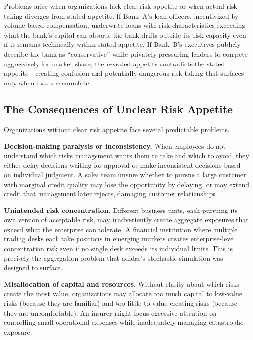 \documentclass[11pt,openany]{book}
\begin{document}
Problems arise when organizations lack clear risk appetite or when actual
risk-taking diverges from stated appetite. If Bank~A's loan officers,
incentivized by volume-based compensation, underwrite loans with risk
characteristics exceeding what the bank's capital can absorb, the bank drifts
outside its risk capacity even if it remains technically within stated appetite.
If Bank~B's executives publicly describe the bank as ``conservative'' while
privately pressuring lenders to compete aggressively for market share, the
revealed appetite contradicts the stated appetite---creating confusion and
potentially dangerous risk-taking that surfaces only when losses accumulate.

\subsection{The Consequences of Unclear Risk Appetite}
\label{subsec:consequences-unclear-appetite}

Organizations without clear risk appetite face several predictable problems.

\textbf{Decision-making paralysis or inconsistency.} When employees do not
understand which risks management wants them to take and which to avoid, they
either delay decisions waiting for approval or make inconsistent decisions based
on individual judgment. A sales team unsure whether to pursue a large customer
with marginal credit quality may lose the opportunity by delaying, or may extend
credit that management later rejects, damaging customer relationships.

\textbf{Unintended risk concentration.} Different business units, each pursuing
its own version of acceptable risk, may inadvertently create aggregate exposures
that exceed what the enterprise can tolerate. A financial institution where
multiple trading desks each take positions in emerging markets creates
enterprise-level concentration risk even if no single desk exceeds its
individual limits. This is precisely the aggregation problem that adidas's
stochastic simulation was designed to surface.

\textbf{Misallocation of capital and resources.} Without clarity about which
risks create the most value, organizations may allocate too much capital to
low-value risks (because they are familiar) and too little to value-creating
risks (because they are uncomfortable). An insurer might focus excessive
attention on controlling small operational expenses while inadequately managing
catastrophe exposure.
\end{document}
